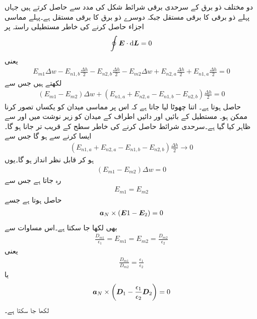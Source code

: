 دو مختلف ذو برق کے سرحدی برقی شرائط شکل  کی مدد سے حاصل کرتے ہیں جہاں پہلے ذو برقی کا برقی مستقل  جبکہ دوسرے ذو برق کا برقی مستقل  ہے۔پہلے مماسی اجزاء حاصل کرنے کی خاطر مستطیلی راستہ  پر
\begin{align*}
\oint \kvec{E} \cdot \dif \kvec{L}=0
\end{align*}
یعنی
\begin{align*}
E_{m1} \Delta w-E_{n1,b}\frac{\Delta h}{2}-E_{n2,b} \frac{\Delta h}{2}-E_{m2}\Delta w+E_{n2,a}\frac{\Delta h}{2}+E_{n1,a} \frac{\Delta h}{2}=0 
\end{align*} 
لکھتے ہیں جس سے
\begin{align*}
(E_{m1} -E_{m2})\Delta w +(E_{n1,a}+E_{n2,a}-E_{n1,b}-E_{n2,b})\frac{\Delta h}{2}=0
\end{align*} 
حاصل ہوتا ہے۔ اتنا چھوٹا لیا جاتا ہے کہ اس پر مماسی میدان کو یکساں تصور کرنا ممکن ہو۔ مستطیل کے بائیں اور دائیں اطراف کے میدان کو زیر نوشت میں  اور  سے ظاہر کیا گیا ہے۔سرحدی شرائط حاصل کرنے کی خاطر سطح کے قریب تر جانا ہو گا۔ایسا کرنے سے  ہو گا جس سے
\begin{align*}
(E_{n1,a}+E_{n2,a}-E_{n1,b}-E_{n2,b})\frac{\Delta h}{2} \to 0
\end{align*} 
ہو کر قابل نظر انداز ہو گا۔یوں
\begin{align*}
(E_{m1} -E_{m2})\Delta w =0
\end{align*} 
رہ جاتا ہے جس سے 
\begin{align}\label{مساوات_کپیسٹر_دو_ذو_برق_سرحدی_شرائط_الف}
E_{m1} =E_{m2}
\end{align} 
حاصل ہوتا ہے جسے
\begin{align}\label{مساوات_کپیسٹر_دو_ذو_برق_سمتی_سرحدی_شرائط_الف}
{\boldsymbol{a}}_N \times \left({{\boldsymbol{E}}}1-{{\boldsymbol{E}}}_2 \right)=0
\end{align} 
بھی لکھا جا سکتا ہے۔اس مساوات سے
\begin{align*}
\frac{D_{m1}}{\epsilon_1}=E_{m1}=E_{m2}=\frac{D_{m2}}{\epsilon_2}
\end{align*}
یعنی
\begin{align}\label{مساوات_کپیسٹر_دو_ذو_برق_سرحدی_شرائط_ب}
\frac{D_{m1}}{D_{m2}}=\frac{\epsilon_1}{\epsilon_2}
\end{align}
یا
\begin{align}\label{مساوات_کپیسٹر_دو_ذو_برق_سمتی_سرحدی_شرائط_ب}
{\boldsymbol{a}}_N \times \left({{\boldsymbol{D}}}_1-\frac{\epsilon_1}{\epsilon_2} {{\boldsymbol{D}}}_2 \right)=0
\end{align}
لکھا جا سکتا ہے۔

